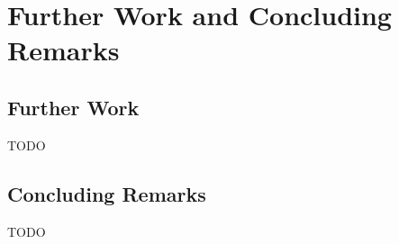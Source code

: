 \chapter{Further Work and Concluding Remarks}
\label{chap:conclusions}

\section{Further Work}

TODO

\section{Concluding Remarks}

TODO
